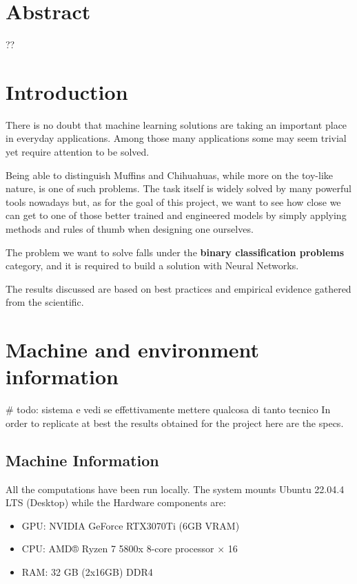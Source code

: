 \newpage
\section{Abstract}
??


\section{Introduction}
There is no doubt that machine learning solutions are taking an important place in everyday applications.
Among those many applications some may seem trivial yet require attention to be solved.

Being able to distinguish Muffins and Chihuahuas, while more on the toy-like nature, is one of such problems.
The task itself is widely solved by many powerful tools nowadays but, as for the goal of this project, we
want to see how close we can get to one of those better trained and engineered models
by simply applying methods and rules of thumb when designing one ourselves.

The problem we want to solve falls under the \textbf{binary classification problems} category,
and it is required to build a solution with Neural Networks.

The results discussed are based on best practices and empirical evidence gathered from the scientific.


\section{Machine and environment information}
# todo: sistema e vedi se effettivamente mettere qualcosa di tanto tecnico
In order to replicate at best the results obtained for the project here are the specs.

\subsection{Machine Information}

All the computations have been run locally.
The system mounts Ubuntu 22.04.4 LTS (Desktop) while the Hardware components are:

\begin{itemize}
    \item GPU: NVIDIA GeForce RTX3070Ti (6GB VRAM)
    \item CPU: AMD® Ryzen 7 5800x 8-core processor × 16
    \item RAM: 32 GB (2x16GB) DDR4
\end{itemize}


